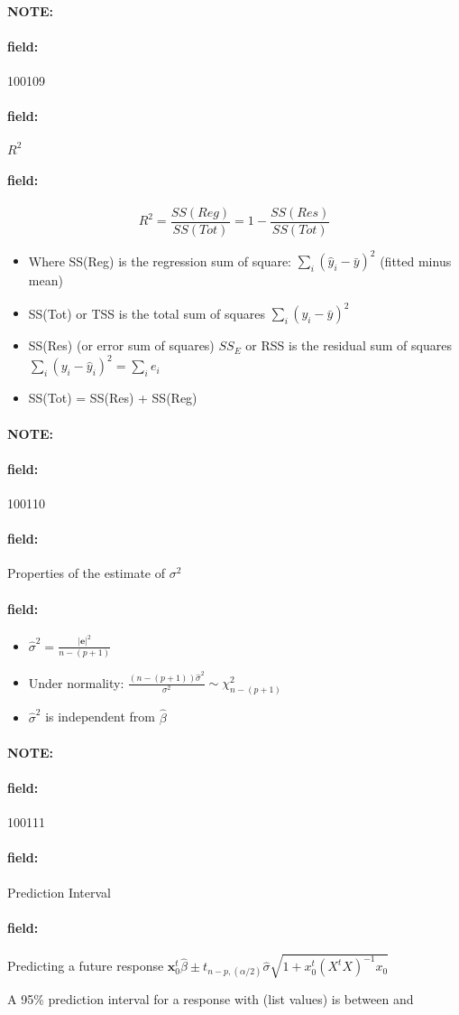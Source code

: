 \documentclass[12pt]{article}
\newenvironment{note}{\paragraph{NOTE:}}{}
\newenvironment{field}{\paragraph{field:}}{}
\begin{document}
\begin{note} \begin{field} \tiny 100109 \end{field}
 \begin{field}
  $R^2$
 \end{field}
 \begin{field}
  $$R^2 = \frac{SS(Reg)}{SS(Tot)} = 1 - \frac{SS(Res)}{SS(Tot)}$$

  \begin{itemize}
    \item Where SS(Reg) is the regression sum of square: $\sum_{i} (\hat{y}_i - \bar{y})^2$ (fitted minus mean)
    \item SS(Tot) or TSS is the total sum of squares $\sum_{i} (y_i - \bar{y})^2$
    \item SS(Res) (or error sum of squares) $SS_E$ or RSS is the residual sum of squares $\sum_i (y_i - \hat{y}_i)^2 = \sum_{i} e_i$
    \item SS(Tot) = SS(Res) + SS(Reg)
  \end{itemize}
 \end{field}
\end{note}



\begin{note} \begin{field} \tiny 100110 \end{field}
 \begin{field}
  Properties of the estimate of $\sigma^2$
 \end{field}
 \begin{field}
  \begin{itemize}
   \item   $\hat{\sigma}^2 = \frac{|\mathbf{e}|^2}{n - (p+1)}$
   \item Under normality: $\frac{(n - (p+1))\hat{\sigma}^2}{\sigma^2} \sim \chi^2_{n - (p+1)}$
   \item $\hat{\sigma}^2$ is independent from $\hat{\beta}$
  \end{itemize}
 \end{field}
\end{note}


\begin{note} \begin{field} \tiny 100111 \end{field}
 \begin{field}
  Prediction Interval
 \end{field}
 \begin{field}
  Predicting a future response
  $\mathbf{x}_0^t \hat{\beta} \pm t_{n-p,(\alpha/2)}\hat{\sigma} \sqrt{1 + x_0^t(X^tX)^{-1}x_0}$

  A 95\% prediction interval for a response with (list values) is between and
 \end{field}
\end{note}
\end{document}
